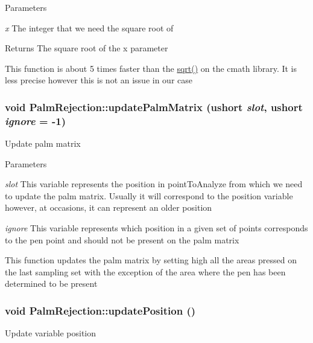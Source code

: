 \begin{DoxyParams}{Parameters}
\item[{\em x}]The integer that we need the square root of \end{DoxyParams}
\begin{DoxyReturn}{Returns}
The square root of the x parameter
\end{DoxyReturn}
This function is about 5 times faster than the \hyperlink{classPalmRejection_aa9a6e18b77805ae5cc32e56896191c20}{sqrt()} on the cmath library. It is less precise however this is not an issue in our case \hypertarget{classPalmRejection_a18a1e21af78e44b8c80bdb5c4ceab1fb}{
\subsubsection[{updatePalmMatrix}]{\setlength{\rightskip}{0pt plus 5cm}void PalmRejection::updatePalmMatrix (ushort {\em slot}, \/  ushort {\em ignore} = {\ttfamily -\/1})}}
\label{classPalmRejection_a18a1e21af78e44b8c80bdb5c4ceab1fb}
Update palm matrix


\begin{DoxyParams}{Parameters}
\item[{\em slot}]This variable represents the position in pointToAnalyze from which we need to update the palm matrix. Usually it will correspond to the position variable however, at occasions, it can represent an older position\item[{\em ignore}]This variable represents which position in a given set of points corresponds to the pen point and should not be present on the palm matrix\end{DoxyParams}
This function updates the palm matrix by setting high all the areas pressed on the last sampling set with the exception of the area where the pen has been determined to be present \hypertarget{classPalmRejection_af65e48ab71b1414d79a02d36345cc630}{
\subsubsection[{updatePosition}]{\setlength{\rightskip}{0pt plus 5cm}void PalmRejection::updatePosition ()}}
\label{classPalmRejection_af65e48ab71b1414d79a02d36345cc630}
Update variable position

